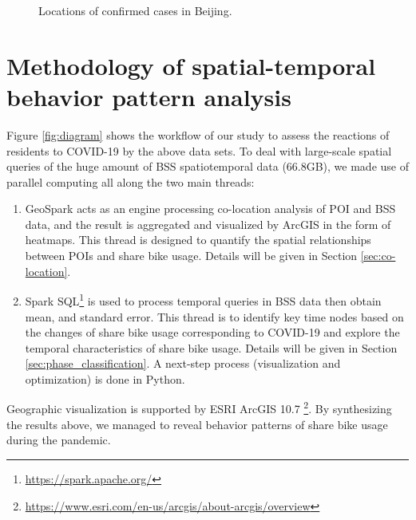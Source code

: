 \documentclass[ijgi,submit,moreauthors,pdftex]{Definitions/mdpi}
\begin{document}
\begin{figure}[ht]
    \centering
    \caption{Locations of confirmed cases in Beijing.}
    \label{fig:locations_of_confirmed_cases}
\end{figure}

\section{Methodology of spatial-temporal behavior pattern analysis}\label{sec:method}

Figure \ref{fig:diagram} shows the workflow of our study to assess the reactions of residents to COVID-19 by the above data sets.
To deal with large-scale spatial queries of the huge amount of BSS spatiotemporal data (66.8GB), we made use of parallel computing all along the two main threads:
\begin{enumerate}
    \item GeoSpark \cite{huang2017geospark} acts as an engine processing co-location analysis of POI and BSS data, and the result is aggregated and visualized by ArcGIS in the form of heatmaps.
    This thread is designed to quantify the spatial relationships between POIs and share bike usage. 
    Details will be given in Section \ref{sec:co-location}.
    \item Spark SQL\footnote{\url{https://spark.apache.org/}} is used to process temporal queries in BSS data then obtain mean, and standard error.
    This thread is to identify key time nodes based on the changes of share bike usage corresponding to COVID-19 and explore the temporal characteristics of share bike usage. 
    Details will be given in Section \ref{sec:phase_classification}.
    A next-step process (visualization and optimization) is done in Python.
\end{enumerate}
Geographic visualization is supported by ESRI ArcGIS 10.7 \footnote{\url{https://www.esri.com/en-us/arcgis/about-arcgis/overview}}.
By synthesizing the results above, we managed to reveal behavior patterns of share bike usage during the pandemic.
\end{document}
